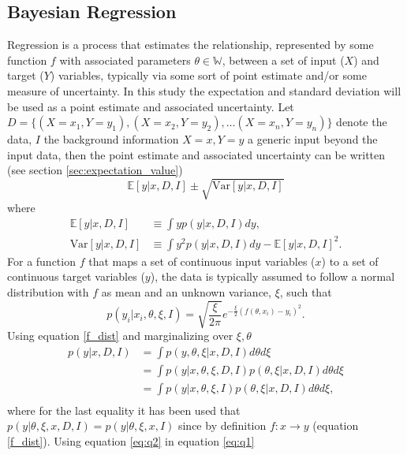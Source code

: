 \subsection{Bayesian Regression}
\label{sec:bayML}
Regression is a process that estimates the relationship, represented by some function $f$ with associated parameters $\theta\in \mathbb{W}$, between a set of input ($X$) and target ($Y$) variables, typically via some sort of point estimate and/or some measure of uncertainty. In this study the expectation and standard deviation will be used as a point estimate and associated uncertainty. Let $D = \{(X=x_1, Y=y_1), (X=x_2, Y=y_2),\dots (X=x_n, Y=y_n)\}$ denote the data, $I$ the background information $X=x, Y=y$ a generic input beyond the input data, then the point estimate and associated uncertainty can be written (see section \ref{sec:expectation_value})
\begin{equation}
	\mathbb{E}[y|x,D,I] \pm \sqrt{\text{Var}[y|x,D,I]}
	\label{eq:expec}
\end{equation}
where
\begin{equation}
	\begin{split}
		\mathbb{E}[y|x,D,I] & \equiv \int y p(y|x,D,I) dy,\\
		\text{Var}[y|x,D,I] & \equiv
		\int y^2 p(y|x,D,I) dy-\mathbb{E}[y|x,D,I]^2.
	\end{split}
	\label{eq:q1}
\end{equation}
For a function $f$ that maps a set of continuous input variables ($x$) to a set of continuous target variables ($y$), the data is typically assumed to follow a normal distribution with $f$ as mean and an unknown variance, $\xi$, such that
\begin{equation}
	p(y_i|x_i,\theta,\xi,I)=\sqrt{\frac{\xi}{2\pi}} e^{-\frac{\xi}{2}(f(\theta,x_i)-y_i)^2}.
	\label{f_dist}
\end{equation}
Using equation \eqref{f_dist} and marginalizing over $\xi,\theta$
\begin{equation}
	\begin{split}
		p(y|x,D,I) &= \int p(y,\theta,\xi|x,D,I) d\theta d\xi\\
		& = \int p(y|x,\theta,\xi,D,I)  p(\theta,\xi|x,D,I)d\theta d\xi\\
		& = \int p(y|x,\theta,\xi,I)  p(\theta,\xi|x,D,I)d\theta d\xi,\\
	\end{split}
	\label{eq:q2}
\end{equation}
where for the last equality it has been used that $p(y|\theta,\xi,x,D,I) = p(y|\theta,\xi,x,I)$ since by definition $f: x\rightarrow y$ (equation \eqref{f_dist}). Using equation \eqref{eq:q2} in equation \eqref{eq:q1}

